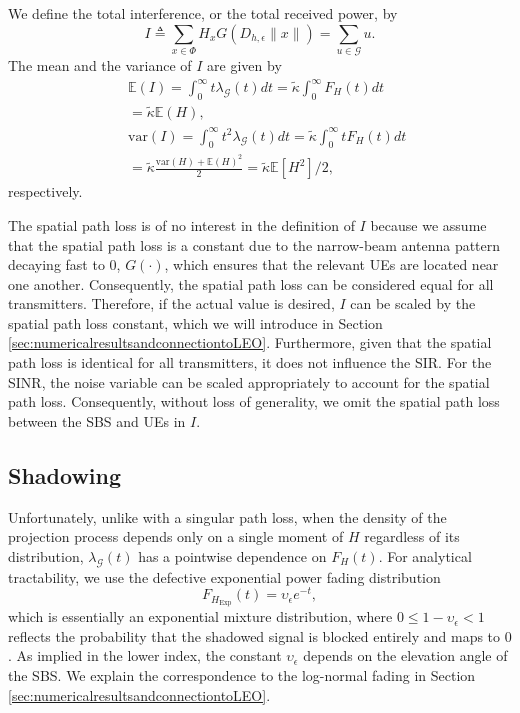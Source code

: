\documentclass[lettersize,journal]{IEEEtran}
\begin{document}
We define the total interference, or the total received power, by
\begin{equation}
  \label{eq:totpow}
  I \triangleq \sum\limits_{x \in \Phi} H_x G(D_{h,\epsilon}\|x\|)=\sum\limits_{u \in \mathcal{G}} u.
\end{equation}
The mean and the variance of $I$ are given by
\begin{align}
  \label{eq:totmean}
  &\mathbb{E}\left(I \right) = \int_{0}^{\infty} t\lambda_{\mathcal{G}}(t) dt = \tilde{\kappa} \int_{0}^{\infty}F_H(t) dt \nonumber \\
  &=\tilde{\kappa} \mathbb{E}(H), \\\
  \label{eq:totvar}
  &\text{var}\left(I \right) = \int_{0}^{\infty} t^2\lambda_{\mathcal{G}}(t) dt= \tilde{\kappa} \int_0^{\infty}tF_H(t) dt  \nonumber \\
  &= \tilde{\kappa} \frac{\text{var}(H) + \mathbb{E}(H)^2}{2} = \tilde{\kappa}  \mathbb{E}[H^2]/2,
\end{align}
respectively.

The spatial path loss is of no interest in the definition of $I$ because we assume that the spatial path loss is a constant due to the narrow-beam antenna pattern decaying fast to $0$, $G(\cdot)$, which ensures that the relevant UEs are located near one another. Consequently, the spatial path loss can be considered equal for all transmitters. Therefore, if the actual value is desired, $I$ can be scaled by the spatial path loss constant, which we will introduce in Section \ref{sec:numericalresultsandconnectiontoLEO}. Furthermore, given that the spatial path loss is identical for all transmitters, it does not influence the SIR. For the SINR, the noise variable can be scaled appropriately to account for the spatial path loss. Consequently, without loss of generality, we omit the spatial path loss between the SBS and UEs in $I$.






\subsection{Shadowing}
Unfortunately, unlike with a singular path loss, when the density of the projection process depends only on a single moment of $H$ regardless of its distribution, $\lambda_{\mathcal{G}}(t)$ has a pointwise dependence on $F_H(t)$. For analytical tractability, we use the defective exponential power fading distribution
\begin{equation}
  \label{eq:defexp}
  F_{{H}_{\text{Exp}}}(t)=\upsilon_{\epsilon} e^{- t},
\end{equation}
 which is essentially an exponential mixture distribution, where $0 \leq 1-\upsilon_{\epsilon} <1$ reflects the probability that the shadowed signal is blocked entirely and maps to $0$. As implied in the lower index, the constant $\upsilon_{\epsilon}$ depends on the elevation angle of the SBS. We explain the correspondence to the log-normal fading in Section \ref{sec:numericalresultsandconnectiontoLEO}.
\end{document}
